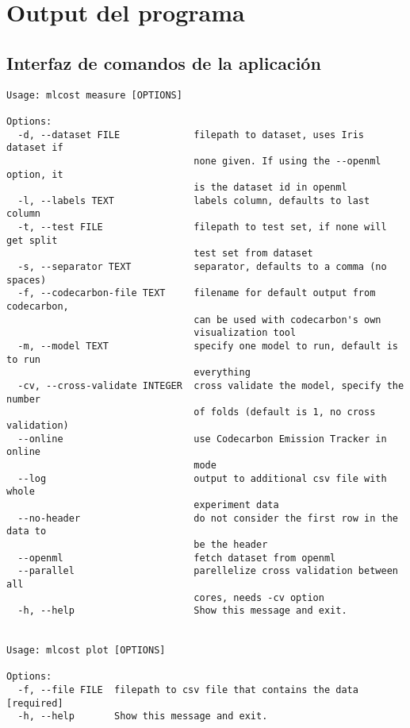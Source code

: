 \chapter{Output del programa}

\section{Interfaz de comandos de la aplicación}
\label{app:cli}

\begin{verbatim}
Usage: mlcost measure [OPTIONS]

Options:
  -d, --dataset FILE             filepath to dataset, uses Iris dataset if
                                 none given. If using the --openml option, it
                                 is the dataset id in openml
  -l, --labels TEXT              labels column, defaults to last column
  -t, --test FILE                filepath to test set, if none will get split
                                 test set from dataset
  -s, --separator TEXT           separator, defaults to a comma (no spaces)
  -f, --codecarbon-file TEXT     filename for default output from codecarbon,
                                 can be used with codecarbon's own
                                 visualization tool
  -m, --model TEXT               specify one model to run, default is to run
                                 everything
  -cv, --cross-validate INTEGER  cross validate the model, specify the number
                                 of folds (default is 1, no cross validation)
  --online                       use Codecarbon Emission Tracker in online
                                 mode
  --log                          output to additional csv file with whole
                                 experiment data
  --no-header                    do not consider the first row in the data to
                                 be the header
  --openml                       fetch dataset from openml
  --parallel                     parellelize cross validation between all
                                 cores, needs -cv option
  -h, --help                     Show this message and exit.


Usage: mlcost plot [OPTIONS]

Options:
  -f, --file FILE  filepath to csv file that contains the data  [required]
  -h, --help       Show this message and exit.
\end{verbatim}

